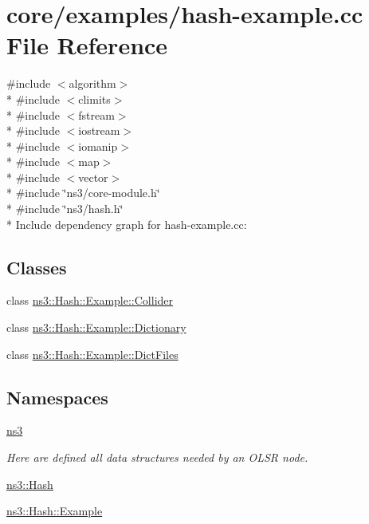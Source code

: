 \hypertarget{hash-example_8cc}{}\section{core/examples/hash-\/example.cc File Reference}
\label{hash-example_8cc}
{\ttfamily \#include $<$algorithm$>$}\\*
{\ttfamily \#include $<$climits$>$}\\*
{\ttfamily \#include $<$fstream$>$}\\*
{\ttfamily \#include $<$iostream$>$}\\*
{\ttfamily \#include $<$iomanip$>$}\\*
{\ttfamily \#include $<$map$>$}\\*
{\ttfamily \#include $<$vector$>$}\\*
{\ttfamily \#include \char`\"{}ns3/core-\/module.\+h\char`\"{}}\\*
{\ttfamily \#include \char`\"{}ns3/hash.\+h\char`\"{}}\\*
Include dependency graph for hash-\/example.cc\+:
\subsection*{Classes}
\begin{DoxyCompactItemize}
\item 
class \hyperlink{classns3_1_1Hash_1_1Example_1_1Collider}{ns3\+::\+Hash\+::\+Example\+::\+Collider}
\item 
class \hyperlink{classns3_1_1Hash_1_1Example_1_1Dictionary}{ns3\+::\+Hash\+::\+Example\+::\+Dictionary}
\item 
class \hyperlink{classns3_1_1Hash_1_1Example_1_1DictFiles}{ns3\+::\+Hash\+::\+Example\+::\+Dict\+Files}
\end{DoxyCompactItemize}
\subsection*{Namespaces}
\begin{DoxyCompactItemize}
\item 
 \hyperlink{namespacens3}{ns3}
\begin{DoxyCompactList}\small\item\em Here are defined all data structures needed by an O\+L\+SR node. \end{DoxyCompactList}\item 
 \hyperlink{namespacens3_1_1Hash}{ns3\+::\+Hash}
\item 
 \hyperlink{namespacens3_1_1Hash_1_1Example}{ns3\+::\+Hash\+::\+Example}
\end{DoxyCompactItemize}
